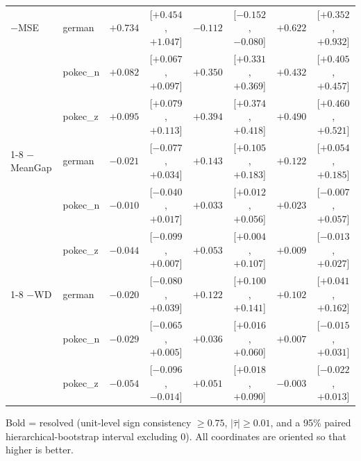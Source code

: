 \begin{table}[t]
\begin{tabular}{llrcrcrc}
$-$MSE & german & $+0.734$ & [$+0.454$, $+1.047$] & $\mathbf{-0.112}$ & [$-0.152$, $-0.080$] & $+0.622$ & [$+0.352$, $+0.932$] \\
 & pokec\_n & $+0.082$ & [$+0.067$, $+0.097$] & $\mathbf{+0.350}$ & [$+0.331$, $+0.369$] & $+0.432$ & [$+0.405$, $+0.457$] \\
 & pokec\_z & $+0.095$ & [$+0.079$, $+0.113$] & $\mathbf{+0.394}$ & [$+0.374$, $+0.418$] & $+0.490$ & [$+0.460$, $+0.521$] \\
\cmidrule(l){1-8}
$-$MeanGap & german & $-0.021$ & [$-0.077$, $+0.034$] & $\mathbf{+0.143}$ & [$+0.105$, $+0.183$] & $+0.122$ & [$+0.054$, $+0.185$] \\
 & pokec\_n & $-0.010$ & [$-0.040$, $+0.017$] & $\mathbf{+0.033}$ & [$+0.012$, $+0.056$] & $+0.023$ & [$-0.007$, $+0.057$] \\
 & pokec\_z & $-0.044$ & [$-0.099$, $+0.007$] & $\mathbf{+0.053}$ & [$+0.004$, $+0.107$] & $+0.009$ & [$-0.013$, $+0.027$] \\
\cmidrule(l){1-8}
$-$WD & german & $-0.020$ & [$-0.080$, $+0.039$] & $\mathbf{+0.122}$ & [$+0.100$, $+0.141$] & $+0.102$ & [$+0.041$, $+0.162$] \\
 & pokec\_n & $-0.029$ & [$-0.065$, $+0.005$] & $\mathbf{+0.036}$ & [$+0.016$, $+0.060$] & $+0.007$ & [$-0.015$, $+0.031$] \\
 & pokec\_z & $-0.054$ & [$-0.096$, $-0.014$] & $\mathbf{+0.051}$ & [$+0.018$, $+0.090$] & $-0.003$ & [$-0.022$, $+0.013$] \\
\bottomrule
\end{tabular}
\par\smallskip\footnotesize Bold = resolved (unit-level sign consistency $\geq 0.75$, $|\hat\tau| \geq 0.01$, and a 95\% paired hierarchical-bootstrap interval excluding 0). All coordinates are oriented so that higher is better.
\end{table}
